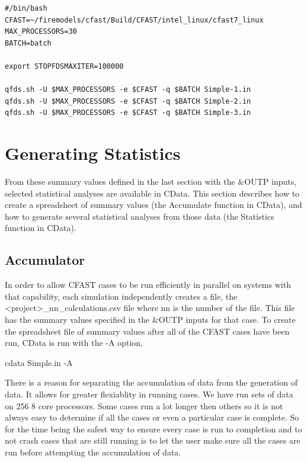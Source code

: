 \documentclass[12pt,twoside]{book}
\begin{document}
\begin{lstlisting}[basicstyle=\scriptsize]
#/bin/bash
CFAST=~/firemodels/cfast/Build/CFAST/intel_linux/cfast7_linux
MAX_PROCESSORS=30
BATCH=batch

export STOPFDSMAXITER=100000

qfds.sh -U $MAX_PROCESSORS -e $CFAST -q $BATCH Simple-1.in
qfds.sh -U $MAX_PROCESSORS -e $CFAST -q $BATCH Simple-2.in
qfds.sh -U $MAX_PROCESSORS -e $CFAST -q $BATCH Simple-3.in
\end{lstlisting}

\section{Generating Statistics}

From these summary values defined in the last section with the {\ct \&OUTP} inputs, selected statistical analyses are available in CData. This section describes how to create a spreadsheet of summary values (the Accumulate function in CData), and how to generate several statistical analyses from those data (the Statistics function in CData).

\subsection{Accumulator}

In order to allow CFAST cases to be run efficiently in parallel on systems with that capability, each simulation independently creates a file, the {\ct <project>\_nn\_calculations.csv} file where {\ct nn} is the number of the file. This file has the summary values specified in the {\ct \&OUTP} inputs for that case. To create the spreadsheet file of summary values after all of the CFAST cases have been run, CData is run with the {\ct -A} option,

\vspace{\baselineskip}
{\ct cdata Simple.in -A}

There is a reason for separating the accumulation of data from the generation of data. It allows for greater flexiablity in running cases. We have run sets of data on 256 8 core processors. Some cases run a lot longer then others so it is not always easy to determine if all the cases or even a particular case is complete. So for the time being the safest way to ensure every case is run to completion and to not crash cases that are still running is to let the user make sure all the cases are run before attempting the accumulation of data.
\end{document}

